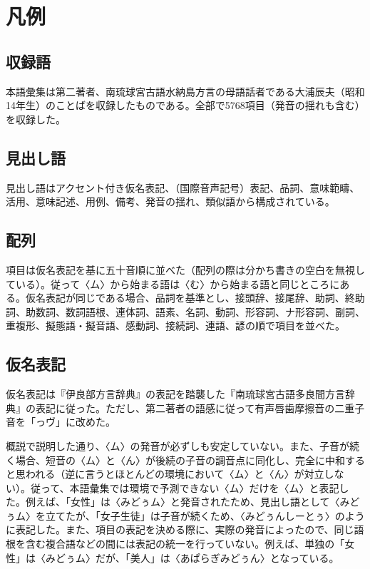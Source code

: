 \chapter*{凡例}\label{hanrei}\setcounter{section}{0}\thispagestyle{plain}

\section{収録語}

本語彙集は第二著者、南琉球宮古語水納島方言の母語話者である大浦辰夫（昭和14年生）のことばを収録したものである。全部で5768項目（発音の揺れも含む）を収録した。

\section{見出し語}

見出し語はアクセント付き仮名表記、（国際音声記号）表記、品詞、意味範疇、活用、意味記述、用例、備考、発音の揺れ、類似語から構成されている。

\section{配列}

項目は仮名表記を基に五十音順に並べた（配列の際は分かち書きの空白を無視している）。従って〈ム〉から始まる語は〈む〉から始まる語と同じところにある。仮名表記が同じである場合、品詞を基準とし、接頭辞、接尾辞、助詞、終助詞、助数詞、数詞語根、連体詞、語素、名詞、動詞、形容詞、ナ形容詞、副詞、重複形、擬態語・擬音語、感動詞、接続詞、連語、諺の順で項目を並べた。

\section{仮名表記}

仮名表記は『伊良部方言辞典』の表記を踏襲した『南琉球宮古語多良間方言辞典』の表記に従った。ただし、第二著者の語感に従って有声唇歯摩擦音の二重子音\ip{[vv]}を「っヴ」に改めた。

概説で説明した通り、〈ム〉の発音が必ずしも安定していない。また、子音が続く場合、短音の〈ム〉と〈ん〉が後続の子音の調音点に同化し、完全に中和すると思われる（逆に言うとほとんどの環境において〈ム〉と〈ん〉が対立しない）。従って、本語彙集では環境で予測できない〈ム〉だけを〈ム〉と表記した。例えば、「女性」は〈みどぅム〉と発音されたため、見出し語として〈みどぅム〉を立てたが、「女子生徒」は子音が続くため、〈みどぅんしーとぅ〉のように表記した。また、項目の表記を決める際に、実際の発音によったので、同じ語根を含む複合語などの間には表記の統一を行っていない。例えば、単独の「女性」は〈みどぅム〉だが、「美人」は〈あぱらぎみどぅん〉となっている。

